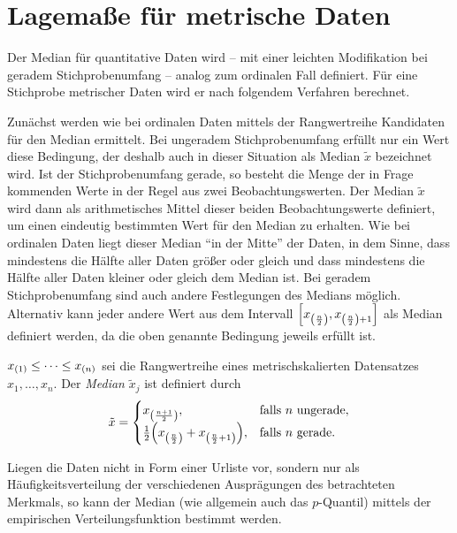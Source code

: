 \documentclass{lecture}
\begin{document}
    \section*{Lagemaße für metrische Daten}

    Der Median für quantitative Daten wird -- mit einer leichten Modifikation bei geradem Stichprobenumfang -- analog zum ordinalen Fall definiert.
    Für eine Stichprobe metrischer Daten wird er nach folgendem Verfahren berechnet.

    Zunächst werden wie bei ordinalen Daten mittels der Rangwertreihe Kandidaten für den Median ermittelt.
    Bei ungeradem Stichprobenumfang erfüllt nur ein Wert diese Bedingung, der deshalb auch in dieser Situation als Median \(\tilde{x}\) bezeichnet wird.
    Ist der Stichprobenumfang gerade, so besteht die Menge der in Frage kommenden Werte in der Regel aus zwei Beobachtungswerten.
    Der Median \(\tilde{x}\) wird dann als arithmetisches Mittel dieser beiden Beobachtungswerte definiert, um einen eindeutig bestimmten Wert für den Median zu erhalten.
    Wie bei ordinalen Daten liegt dieser Median ``in der Mitte'' der Daten, in dem Sinne, dass mindestens die Hälfte aller Daten größer oder gleich und dass mindestens die Hälfte aller Daten kleiner oder gleich dem Median ist.
    Bei geradem Stichprobenumfang sind auch andere Festlegungen des Medians möglich.
    Alternativ kann jeder andere Wert aus dem Intervall \(\brackets*{x_{\parentheses*{\frac{n}{2}}}, x_{\parentheses*{\frac{n}{2}} + 1}}\) als Median definiert werden, da die oben genannte Bedingung jeweils erfüllt ist.

    \begin{definition}\label{def:5}
        \(x_{\parentheses*{1}} \le \cdots \le x_{\parentheses*{n}}\) sei die Rangwertreihe eines metrischskalierten Datensatzes \(x_1, \ldots, x_n\).
        Der \emph{Median} \(\tilde{x}_j\) ist definiert durch
        \[
            \tilde{x} = \begin{cases}
                x_{\parentheses*{\frac{n + 1}{2}}}, & \text{falls }n\text{ ungerade},\\
                \frac{1}{2}\parentheses*{x_{\parentheses*{\frac{n}{2}}} + x_{\parentheses*{\frac{n}{2} + 1}}}, & \text{falls }n\text{ gerade}.
            \end{cases}
        \]
    \end{definition}

    Liegen die Daten nicht in Form einer Urliste vor, sondern nur als Häufigkeitsverteilung der verschiedenen Ausprägungen des betrachteten Merkmals, so kann der Median (wie allgemein auch das \(p\)-Quantil) mittels der empirischen Verteilungsfunktion bestimmt werden.
\end{document}
